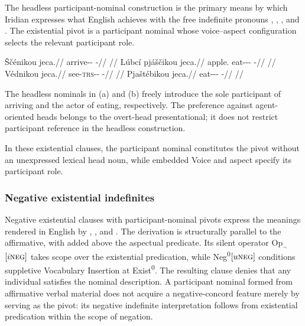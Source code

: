 The headless participant-nominal construction is the primary means by which
Iridian expresses what English achieves with the free indefinite pronouns
, , , and . The
existential pivot is a participant nominal whose voice--aspect configuration selects the
relevant participant role.

\pex
\a
\begingl
\gla Ščénikou jeca.//
\glb arrive-\Pf{}-\Nmlz{} \Exst{}-\Cont{}//
\glft {} //
\endgl
\a
\begingl
\gla Lúbcí pjáščikou jeca.//
\glb apple.\Ind{} eat-\Antip{}-\Pf{}-\Nmlz{} \Exst{}-\Cont{}//
\glft {} //
\endgl
\a
\begingl
\gla Védnikou jeca.//
\glb see-\textsc{trs}-\Pf{}-\Nmlz{} \Exst{}-\Cont{}//
\glft {} //
\endgl
\a
\begingl
\gla Pjaštébikou jeca.//
\glb eat-\Appl{}-\Pf{}-\Nmlz{} \Exst{}-\Cont{}//
\glft {} //
\endgl
\xe

The headless nominals in (a) and (b) freely introduce the sole participant
of arriving and the actor of eating, respectively. The preference against
agent-oriented heads belongs to the overt-head presentational; it does not
restrict participant reference in the headless construction.

In these existential clauses, the participant nominal constitutes the pivot
without an unexpressed lexical head noun, while embedded Voice and aspect
specify its participant role.

\subsubsection{Negative existential indefinites}
\label{sec:exst-indef-neg}

Negative existential clauses with participant-nominal pivots express the
meanings rendered in English by , , and
. The derivation is structurally parallel to the affirmative,
with  added above the aspectual predicate. Its silent operator
$\mathrm{Op}_{\neg}$$[i\textsc{neg}]$ takes scope over the existential predication, while
Neg\textsuperscript{0}$[u\textsc{neg}]$ conditions suppletive Vocabulary Insertion at
Exist\textsuperscript{0}. The resulting clause denies that any individual
satisfies the nominal description. A participant nominal formed from
affirmative verbal material does not acquire a negative-concord feature merely
by serving as the pivot: its negative indefinite interpretation follows from
existential predication within the scope of negation.

